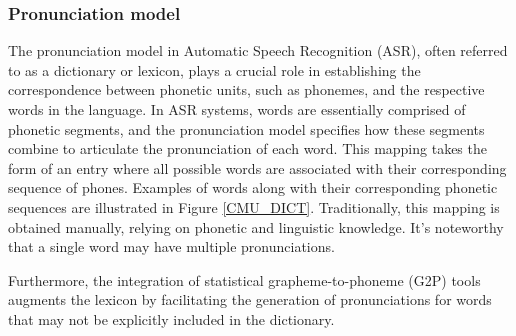 \subsubsection{Pronunciation model} %
The pronunciation model in Automatic Speech Recognition (ASR), often referred to as a dictionary or lexicon, plays a crucial role in establishing the correspondence between phonetic units, such as phonemes, and the respective words in the language. In ASR systems, words are essentially comprised of phonetic segments, and the pronunciation model specifies how these segments combine to articulate the pronunciation of each word. This mapping takes the form of an entry where all possible words are associated with their corresponding sequence of phones. Examples of words along with their corresponding phonetic sequences are illustrated in Figure \ref{CMU_DICT}. Traditionally, this mapping is obtained manually, relying on phonetic and linguistic knowledge. It's noteworthy that a single word may have multiple pronunciations.

Furthermore, the integration of statistical grapheme-to-phoneme (G2P) tools \cite{g2p} augments the lexicon by facilitating the generation of pronunciations for words that may not be explicitly included in the dictionary.



